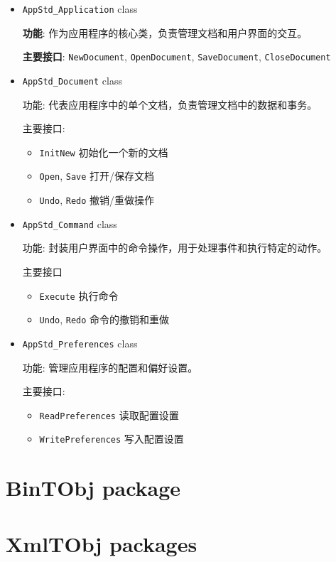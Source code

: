 \documentclass[11pt]{article}
\begin{document}
\begin{itemize}
\item \texttt{AppStd\_Application} class

\textbf{功能}: 作为应用程序的核心类，负责管理文档和用户界面的交互。

\textbf{主要接口}: \texttt{NewDocument}, \texttt{OpenDocument}, \texttt{SaveDocument}, \texttt{CloseDocument}

\item \texttt{AppStd\_Document} class

功能: 代表应用程序中的单个文档，负责管理文档中的数据和事务。

主要接口:

\begin{itemize}
\item \texttt{InitNew} 初始化一个新的文档
\item \texttt{Open}, \texttt{Save} 打开/保存文档
\item \texttt{Undo}, \texttt{Redo} 撤销/重做操作
\end{itemize}

\item \texttt{AppStd\_Command} class

功能: 封装用户界面中的命令操作，用于处理事件和执行特定的动作。

主要接口

\begin{itemize}
\item \texttt{Execute} 执行命令
\item \texttt{Undo}, \texttt{Redo} 命令的撤销和重做
\end{itemize}

\item \texttt{AppStd\_Preferences} class

功能: 管理应用程序的配置和偏好设置。

主要接口:

\begin{itemize}
\item \texttt{ReadPreferences} 读取配置设置
\item \texttt{WritePreferences} 写入配置设置
\end{itemize}
\end{itemize}
\section{BinTObj package}
\label{sec:orgc8f49d0}

\section{XmlTObj packages}
\label{sec:org31bca08}
\end{document}
